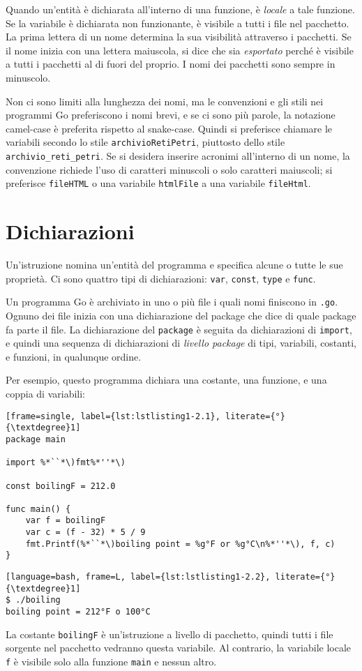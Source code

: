 Quando un'entità è dichiarata all'interno di una funzione, è \textit{locale} a tale funzione.
Se la variabile è dichiarata non funzionante, è visibile a tutti i file nel pacchetto.
La prima lettera di un nome determina la sua visibilità attraverso i pacchetti.
Se il nome inizia con una lettera maiuscola, si dice che sia \textit{esportato} perché è visibile a tutti i pacchetti al di fuori del proprio.
I nomi dei pacchetti sono sempre in minuscolo.

Non ci sono limiti alla lunghezza dei nomi, ma le convenzioni e gli stili nei programmi Go preferiscono i nomi brevi, e se ci sono più parole, la notazione camel-case è preferita rispetto al snake-case.
Quindi si preferisce chiamare le variabili secondo lo stile \verb|archivioRetiPetri|, piuttosto dello stile \verb|archivio_reti_petri|.
Se si desidera inserire acronimi all'interno di un nome, la convenzione richiede l'uso di caratteri minuscoli o solo caratteri maiuscoli;
si preferisce \verb|fileHTML| o una variabile \verb|htmlFile| a una variabile \verb|fileHtml|.


\section{Dichiarazioni}
\label{sec:dichiarazioni}%
Un'istruzione nomina un'entità del programma e specifica alcune o tutte le sue proprietà.
Ci sono quattro tipi di dichiarazioni: \verb|var|, \verb|const|, \verb|type| e \verb|func|.

Un programma Go è archiviato in uno o più file i quali nomi finiscono in \verb|.go|.
Ognuno dei file inizia con una dichiarazione del package che dice di quale package fa parte il file.
La dichiarazione del \verb|package| è seguita da dichiarazioni di \verb|import|, e quindi una sequenza di dichiarazioni di \textit{livello package} di tipi, variabili, costanti, e funzioni, in qualunque ordine.

Per esempio, questo programma dichiara una costante, una funzione, e una coppia di variabili:
\begin{lstlisting}[frame=single, label={lst:lstlisting1-2.1}, literate={°}{\textdegree}1]
package main

import %*``*\)fmt%*''*\)

const boilingF = 212.0

func main() {
    var f = boilingF
    var c = (f - 32) * 5 / 9
    fmt.Printf(%*``*\)boiling point = %g°F or %g°C\n%*''*\), f, c)
}
\end{lstlisting}
\begin{lstlisting}[language=bash, frame=L, label={lst:lstlisting1-2.2}, literate={°}{\textdegree}1]
$ ./boiling
boiling point = 212°F o 100°C
\end{lstlisting}
La costante \verb|boilingF| è un'istruzione a livello di pacchetto, quindi tutti i file sorgente nel pacchetto vedranno questa variabile.
Al contrario, la variabile locale \verb|f| è visibile solo alla funzione \verb|main| e nessun altro.



